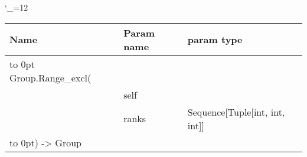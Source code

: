 \begingroup \catcode`\_=12 \tt
\begin{tabular}{lll}
\toprule
\textrm{Name}&\textrm{Param name}&\textrm{param type}\\
\midrule
\hbox to 0pt {Group.Range_excl(\hss}\\
& self\\
& ranks & Sequence[Tuple[int, int, int]]\\
\hbox to 0pt{) -> Group\hss}\\
\bottomrule
\end{tabular}
\endgroup
